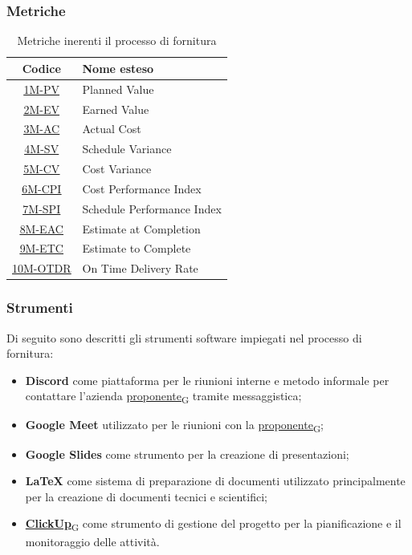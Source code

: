 \subsubsection{Metriche}
\begin{table}[!h]
	\centering
	\begin{tabular}{ | c | l | }
		\hline
		\textbf{Codice}                       & \textbf{Nome esteso}       \\
		\hline
		\underline{\hyperlink{1M}{1M-PV}}     & Planned Value              \\
		\underline{\hyperlink{2M}{2M-EV}}     & Earned Value               \\
		\underline{\hyperlink{3M}{3M-AC}}     & Actual Cost                \\
		\underline{\hyperlink{4M}{4M-SV}}     & Schedule Variance          \\
		\underline{\hyperlink{5M}{5M-CV}}     & Cost Variance              \\
		\underline{\hyperlink{6M}{6M-CPI}}    & Cost Performance Index     \\
		\underline{\hyperlink{7M}{7M-SPI}}    & Schedule Performance Index \\
		\underline{\hyperlink{8M}{8M-EAC}}    & Estimate at Completion     \\
		\underline{\hyperlink{9M}{9M-ETC}}    & Estimate to Complete       \\
		\underline{\hyperlink{10M}{10M-OTDR}} & On Time Delivery Rate      \\
		\hline
	\end{tabular}
	\caption{Metriche inerenti il processo di fornitura}
\end{table}

\subsubsection{Strumenti}
Di seguito sono descritti gli strumenti software impiegati nel processo di fornitura:
\begin{itemize}
	\item \textbf{Discord} come piattaforma per le riunioni interne e metodo informale per contattare l'azienda \href{https://7last.github.io/docs/rtb/documentazione-interna/glossario\#proponente}{proponente\textsubscript{G}} tramite messaggistica;
	\item \textbf{Google Meet} utilizzato per le riunioni con la \href{https://7last.github.io/docs/rtb/documentazione-interna/glossario\#proponente}{proponente\textsubscript{G}};
	\item \textbf{Google Slides} come strumento per la creazione di presentazioni;
	\item \textbf{LaTeX} come sistema di preparazione di documenti utilizzato principalmente per la creazione di documenti tecnici e scientifici;
	\item \href{https://7last.github.io/docs/rtb/documentazione-interna/glossario\#clickup}{\textbf{ClickUp}\textsubscript{G}} come strumento di gestione del progetto per la pianificazione e il monitoraggio delle attività.
\end{itemize}

